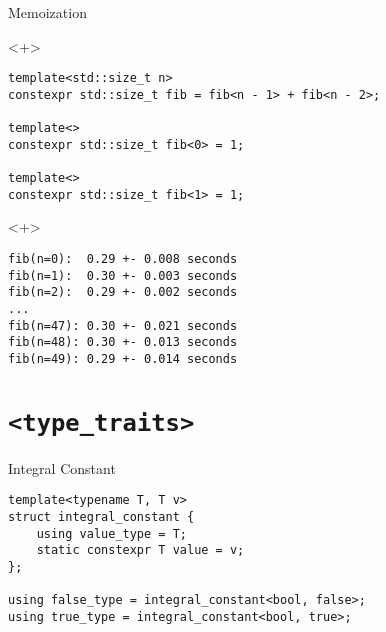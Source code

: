 \documentclass[table]{beamer}
\newcommand{\typetraits}{\texttt{<type\_traits>}}
\begin{document}
\begin{frame}[fragile]{Memoization}
  \begin{onlyenv}<+>
    \begin{verbatim}    
template<std::size_t n>
constexpr std::size_t fib = fib<n - 1> + fib<n - 2>;

template<>
constexpr std::size_t fib<0> = 1;

template<>
constexpr std::size_t fib<1> = 1;
    \end{verbatim}
  \end{onlyenv}

  \begin{onlyenv}<+>
    \begin{verbatim}
fib(n=0):  0.29 +- 0.008 seconds
fib(n=1):  0.30 +- 0.003 seconds
fib(n=2):  0.29 +- 0.002 seconds
...
fib(n=47): 0.30 +- 0.021 seconds
fib(n=48): 0.30 +- 0.013 seconds
fib(n=49): 0.29 +- 0.014 seconds
    \end{verbatim}
  \end{onlyenv}
\end{frame}

\section{\typetraits}

\begin{frame}[fragile]{Integral Constant}
  \begin{verbatim}
template<typename T, T v>
struct integral_constant {
    using value_type = T;
    static constexpr T value = v;
};

using false_type = integral_constant<bool, false>;
using true_type = integral_constant<bool, true>;
  \end{verbatim}
\end{frame}
\end{document}
